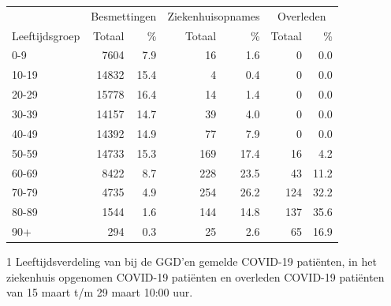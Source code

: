 \documentclass[
  english,
  man,floatsintext]{apa6}
\begin{document}
\begin{table}
\centering\begingroup\fontsize{11}{13}\selectfont

\begin{threeparttable}
\begin{tabular}{lrrrrrr}
\toprule
\multicolumn{1}{c}{ } & \multicolumn{2}{c}{Besmettingen} & \multicolumn{2}{c}{Ziekenhuisopnames} & \multicolumn{2}{c}{Overleden} \\
\cmidrule(l{3pt}r{3pt}){2-3} \cmidrule(l{3pt}r{3pt}){4-5} \cmidrule(l{3pt}r{3pt}){6-7}
Leeftijdsgroep & Totaal & \% & Totaal & \% & Totaal & \%\\
\midrule
0-9 & 7604 & 7.9 & 16 & 1.6 & 0 & 0.0\\
10-19 & 14832 & 15.4 & 4 & 0.4 & 0 & 0.0\\
20-29 & 15778 & 16.4 & 14 & 1.4 & 0 & 0.0\\
30-39 & 14157 & 14.7 & 39 & 4.0 & 0 & 0.0\\
40-49 & 14392 & 14.9 & 77 & 7.9 & 0 & 0.0\\
50-59 & 14733 & 15.3 & 169 & 17.4 & 16 & 4.2\\
60-69 & 8422 & 8.7 & 228 & 23.5 & 43 & 11.2\\
70-79 & 4735 & 4.9 & 254 & 26.2 & 124 & 32.2\\
80-89 & 1544 & 1.6 & 144 & 14.8 & 137 & 35.6\\
90+ & 294 & 0.3 & 25 & 2.6 & 65 & 16.9\\
\bottomrule
\end{tabular}
\begin{tablenotes}
\item[1] Leeftijdsverdeling van bij de GGD’en gemelde COVID-19 patiënten, in het ziekenhuis opgenomen COVID-19 patiënten en overleden COVID-19 patiënten van 15 maart t/m 29 maart 10:00 uur.
\end{tablenotes}
\end{threeparttable}
\endgroup{}
\end{table}

\newpage
\end{document}
